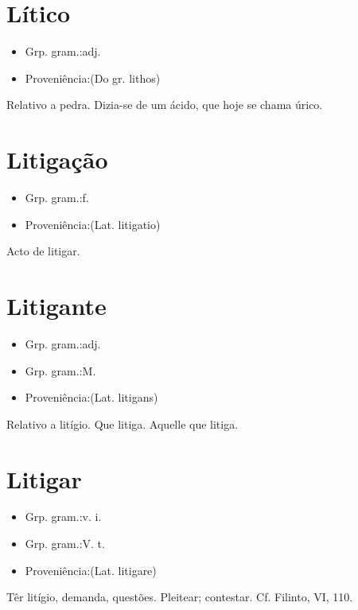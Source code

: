 \section{Lítico}
\begin{itemize}
\item {Grp. gram.:adj.}
\end{itemize}
\begin{itemize}
\item {Proveniência:(Do gr. \textunderscore lithos\textunderscore )}
\end{itemize}
Relativo a pedra.
Dizia-se de um ácido, que hoje se chama \textunderscore úrico\textunderscore .
\section{Litigação}
\begin{itemize}
\item {Grp. gram.:f.}
\end{itemize}
\begin{itemize}
\item {Proveniência:(Lat. \textunderscore litigatio\textunderscore )}
\end{itemize}
Acto de litigar.
\section{Litigante}
\begin{itemize}
\item {Grp. gram.:adj.}
\end{itemize}
\begin{itemize}
\item {Grp. gram.:M.}
\end{itemize}
\begin{itemize}
\item {Proveniência:(Lat. \textunderscore litigans\textunderscore )}
\end{itemize}
Relativo a litígio.
Que litiga.
Aquelle que litiga.
\section{Litigar}
\begin{itemize}
\item {Grp. gram.:v. i.}
\end{itemize}
\begin{itemize}
\item {Grp. gram.:V. t.}
\end{itemize}
\begin{itemize}
\item {Proveniência:(Lat. \textunderscore litigare\textunderscore )}
\end{itemize}
Têr litígio, demanda, questões.
Pleitear; contestar. Cf. Filinto, VI, 110.
